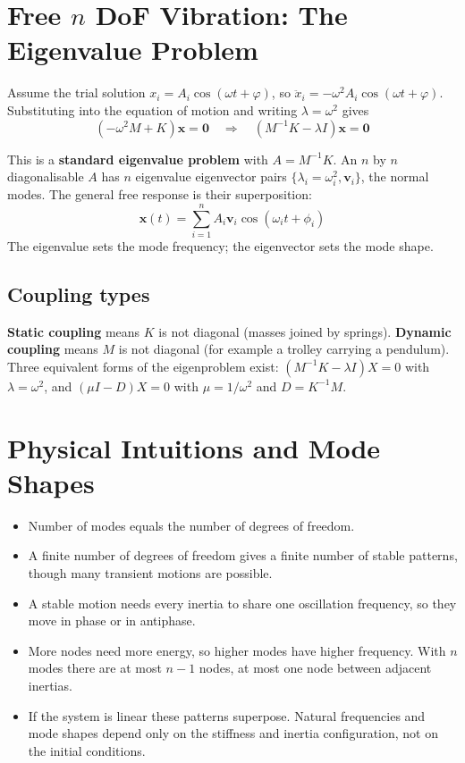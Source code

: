 \documentclass[10pt,a4paper]{article}
\begin{document}
\section{Free \texorpdfstring{$n$}{n} DoF Vibration: The Eigenvalue Problem}
Assume the trial solution $x_i = A_i\cos(\omega t + \varphi)$, so $\ddot{x}_i = -\omega^2 A_i\cos(\omega t + \varphi)$. Substituting into the equation of motion and writing $\lambda = \omega^2$ gives
\begin{equation}
  (-\omega^2 M + K)\mathbf{x} = \mathbf{0} \quad\Rightarrow\quad (M^{-1}K - \lambda I)\mathbf{x} = \mathbf{0}
\end{equation}
\begin{varlist}
\end{varlist}

This is a \textbf{standard eigenvalue problem} with $A = M^{-1}K$. An $n$ by $n$ diagonalisable $A$ has $n$ eigenvalue eigenvector pairs $\{\lambda_i = \omega_i^2, \mathbf{v}_i\}$, the normal modes. The general free response is their superposition:
\begin{equation}
  \mathbf{x}(t) = \sum_{i=1}^{n} A_i\mathbf{v}_i\cos(\omega_i t + \phi_i)
\end{equation}
The eigenvalue sets the mode frequency; the eigenvector sets the mode shape.

\subsection{Coupling types}
\textbf{Static coupling} means $K$ is not diagonal (masses joined by springs). \textbf{Dynamic coupling} means $M$ is not diagonal (for example a trolley carrying a pendulum). Three equivalent forms of the eigenproblem exist: $(M^{-1}K - \lambda I)X = 0$ with $\lambda = \omega^2$, and $(\mu I - D)X = 0$ with $\mu = 1/\omega^2$ and $D = K^{-1}M$.

\section{Physical Intuitions and Mode Shapes}
\begin{itemize}
  \item Number of modes equals the number of degrees of freedom.
  \item A finite number of degrees of freedom gives a finite number of stable patterns, though many transient motions are possible.
  \item A stable motion needs every inertia to share one oscillation frequency, so they move in phase or in antiphase.
  \item More nodes need more energy, so higher modes have higher frequency. With $n$ modes there are at most $n-1$ nodes, at most one node between adjacent inertias.
  \item If the system is linear these patterns superpose. Natural frequencies and mode shapes depend only on the stiffness and inertia configuration, not on the initial conditions.
\end{itemize}
\end{document}
